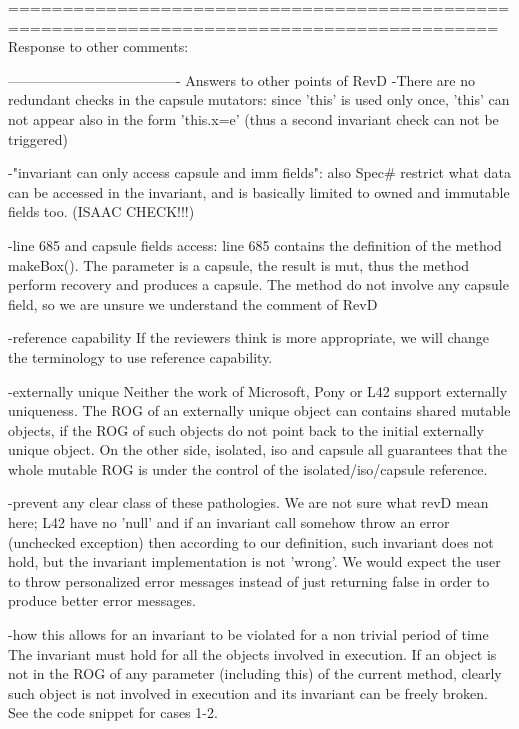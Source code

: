 ===========================================================================================
Response to other comments:

-------------------------------------
Answers to other points of RevD
-There are no redundant checks in the capsule mutators: since 'this' is used only once,
 'this' can not appear also in the form 'this.x=e' (thus a second invariant check can not be triggered)

-"invariant can only access capsule and imm fields":
also Spec# restrict what data can be accessed in the invariant, and is basically limited
to owned and immutable fields too. (ISAAC CHECK!!!)

-line 685 and capsule fields access:
line 685 contains the definition of the method makeBox().
The parameter is a capsule, the result is mut, thus the method perform recovery and produces a capsule.
The method do not involve any capsule field, so we are unsure we understand the comment of RevD

-reference capability 
  If the reviewers think is more appropriate, we will change the terminology to use reference capability.

-externally unique
Neither the work of Microsoft, Pony or L42 support externally uniqueness.
The ROG of an externally unique object can contains shared mutable objects,
if the ROG of such objects do not point back to the initial externally unique object.
On the other side, isolated, iso and capsule all guarantees that the whole mutable ROG
is under the control of the isolated/iso/capsule reference.

-prevent any clear class of these pathologies.
We are not sure what revD mean here; L42 have no 'null' and if an invariant call
somehow throw an error (unchecked exception) then according to our definition, such invariant does
not hold, but the invariant implementation is not 'wrong'. We would expect the user to 
throw personalized error messages instead of just returning false in order to produce better error messages.

-how this allows for an invariant to be violated for a non trivial period of time
The invariant must hold for all the objects involved in execution.
If an object is not in the ROG of any parameter (including this) of the current method,
clearly such object is not involved in execution and its invariant can be freely broken.
 See the code snippet for cases 1-2.


